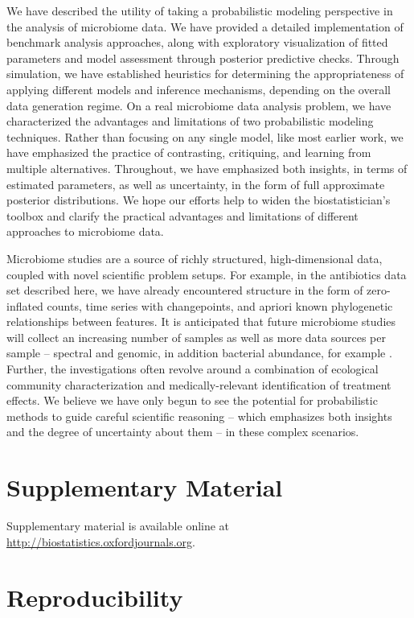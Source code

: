 \documentclass{article}
\begin{document}
We have described the utility of taking a probabilistic modeling perspective in
the analysis of microbiome data. We have provided a detailed implementation of
benchmark analysis approaches, along with exploratory visualization of fitted
parameters and model assessment through posterior predictive checks. Through
simulation, we have established heuristics for determining the appropriateness
of applying different models and inference mechanisms, depending on the overall
data generation regime. On a real microbiome data analysis problem, we have
characterized the advantages and limitations of two probabilistic modeling
techniques. Rather than focusing on any single model, like most earlier work, we
have emphasized the practice of contrasting, critiquing, and learning from
multiple alternatives. Throughout, we have emphasized both insights, in terms of
estimated parameters, as well as uncertainty, in the form of full approximate
posterior distributions. We hope our efforts help to widen the biostatistician's
toolbox and clarify the practical advantages and limitations of different
approaches to microbiome data.

Microbiome studies are a source of richly structured, high-dimensional data,
coupled with novel scientific problem setups. For example, in the antibiotics
data set described here, we have already encountered structure in the form of
zero-inflated counts, time series with changepoints, and apriori known
phylogenetic relationships between features. It is anticipated that future
microbiome studies will collect an increasing number of samples as well as more
data sources per sample -- spectral and genomic, in addition bacterial
abundance, for example \citep{jansson2016multi}. Further, the investigations
often revolve around a combination of ecological community characterization and
medically-relevant identification of treatment effects. We believe we have only
begun to see the potential for probabilistic methods to guide careful scientific
reasoning -- which emphasizes both insights and the degree of uncertainty about
them -- in these complex scenarios.

\section{Supplementary Material}

Supplementary material is available online at
\url{http://biostatistics.oxfordjournals.org}.

\section{Reproducibility}
\end{document}
